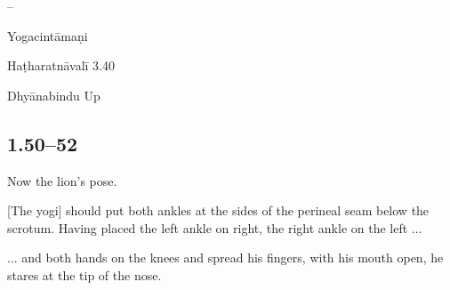 \begin{ekdosis}
\begin{sources}[hp01_049]
--
\end{sources}

\begin{testimonia}[hp01_049]
Yogacintāmaṇi

\begin{versinnote}
\end{versinnote}

Haṭharatnāvalī 3.40

\begin{versinnote}
\end{versinnote}

Dhyānabindu Up

\begin{versinnote}
\end{versinnote}

\end{testimonia}


\subsection*{1.50--52}
\begin{translation}[hp01_050]
Now the lion’s pose.

[The yogi] should put both ankles at the sides of the perineal seam below the scrotum. Having placed the left ankle on right, the right ankle on the left ...
\end{translation}

\begin{translation}[hp01_051]
... and both hands on the knees and spread his fingers, with his mouth open, he stares at the tip of the nose.
\end{translation}


\end{ekdosis}
